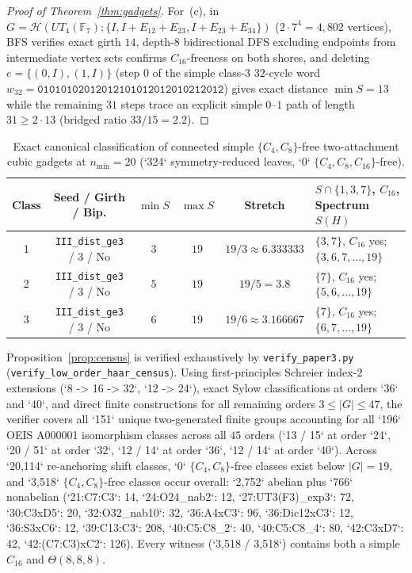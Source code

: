 \documentclass[11pt]{amsart}
\theoremstyle{definition}
\theoremstyle{remark}
\newcommand{\F}{\mathbb{F}}
\newcommand{\Haar}{\mathcal{H}}
\begin{document}
\begin{proof}[Proof of Theorem~\ref{thm:gadgets}]
For~(c), in $G = \Haar(UT_4(\F_7); \{I, I+E_{12}+E_{23}, I+E_{23}+E_{34}\})$ ($2 \cdot 7^4 = 4{,}802$ vertices), BFS verifies exact girth $14$, depth-$8$ bidirectional DFS excluding endpoints from intermediate vertex sets confirms $C_{16}$-freeness on both shores, and deleting $e = \{(0,I), (1,I)\}$ (step $0$ of the simple class-$3$ $32$-cycle word $w_{32} = \mathtt{01010102012012101012012010212012}$) gives exact distance $\min S = 13$ while the remaining $31$ steps trace an explicit simple $0\text{--}1$ path of length $31 \ge 2 \cdot 13$ (bridged ratio $33/15 = 2.2$).
\end{proof}

\begin{table}[htbp]
\centering
\caption{Exact canonical classification of connected simple $\{C_4, C_8\}$-free two-attachment cubic gadgets at $n_{\min} = 20$ (`324` symmetry-reduced leaves, `0` $\{C_4, C_8, C_{16}\}$-free).}\label{tab:n20}
\begin{tabular}{cccccl}
\toprule
Class & Seed / Girth / Bip. & $\min S$ & $\max S$ & Stretch & $S \cap \{1,3,7\}$, $C_{16}$, Spectrum $S(H)$ \\
\midrule
1 & \texttt{III\_dist\_ge3} / $3$ / No & $3$ & $19$ & $19/3 \approx 6.333333$ & $\{3, 7\}$, $C_{16}$ yes; $\{3, 6, 7, \dots, 19\}$ \\
2 & \texttt{III\_dist\_ge3} / $3$ / No & $5$ & $19$ & $19/5 = 3.8$ & $\{7\}$, $C_{16}$ yes; $\{5, 6, \dots, 19\}$ \\
3 & \texttt{III\_dist\_ge3} / $3$ / No & $6$ & $19$ & $19/6 \approx 3.166667$ & $\{7\}$, $C_{16}$ yes; $\{6, 7, \dots, 19\}$ \\
\bottomrule
\end{tabular}
\end{table}

Proposition~\ref{prop:census} is verified exhaustively by \texttt{verify\_paper3.py} (\texttt{verify\_low\_order\_haar\_census}). Using first-principles Schreier index-$2$ extensions (`8 -> 16 -> 32`, `12 -> 24`), exact Sylow classifications at orders `36` and `40`, and direct finite constructions for all remaining orders $3 \le |G| \le 47$, the verifier covers all `151` unique two-generated finite groups accounting for all `196` OEIS A000001 isomorphism classes across all $45$ orders (`13 / 15` at order `24`, `20 / 51` at order `32`, `12 / 14` at order `36`, `12 / 14` at order `40`). Across `20,114` re-anchoring shift classes, `0` $\{C_4, C_8\}$-free classes exist below $|G| = 19$, and `3,518` $\{C_4, C_8\}$-free classes occur overall: `2,752` abelian plus `766` nonabelian (`21:C7:C3`: 14, `24:O24_nab2`: 12, `27:UT3(F3)_exp3`: 72, `30:C3xD5`: 20, `32:O32_nab10`: 32, `36:A4xC3`: 96, `36:Dic12xC3`: 12, `36:S3xC6`: 12, `39:C13:C3`: 208, `40:C5:C8_2`: 40, `40:C5:C8_4`: 80, `42:C3xD7`: 42, `42:(C7:C3)xC2`: 126). Every witness (`3,518 / 3,518`) contains both a simple $C_{16}$ and $\Theta(8,8,8)$.
\end{document}
